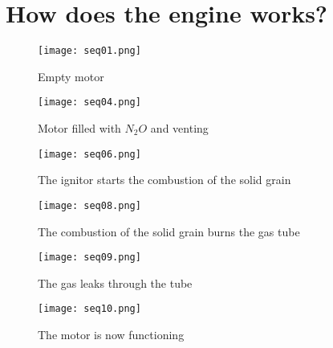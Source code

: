 
\section*{How does the engine works?}

\begin{figure}[H]
  \centering
  \texttt{[image: seq01.png]}
  \caption{Empty motor}
  \label{fig:emptyMotor}
\end{figure}

\begin{figure}[H]
  \centering
  \texttt{[image: seq04.png]}
  \caption{Motor filled with $N_2O$ and venting}
  \label{fig:filledMotor}
\end{figure}

\begin{figure}[H]
  \centering
  \texttt{[image: seq06.png]}
  \caption{The ignitor starts the combustion of the solid grain}
  \label{fig:startSolidBurnMotor}
\end{figure}

\begin{figure}[H]
  \centering
  \texttt{[image: seq08.png]}
  \caption{The combustion of the solid grain burns the gas tube}
  \label{fig:solidBurningMotor}
\end{figure}

\begin{figure}[H]
  \centering
  \texttt{[image: seq09.png]}
  \caption{The gas leaks through the tube}
  \label{fig:gasLeakingMotor}
\end{figure}

\begin{figure}[H]
  \centering
  \texttt{[image: seq10.png]}
  \caption{The motor is now functioning}
  \label{fig:functioningMotor}
\end{figure}
